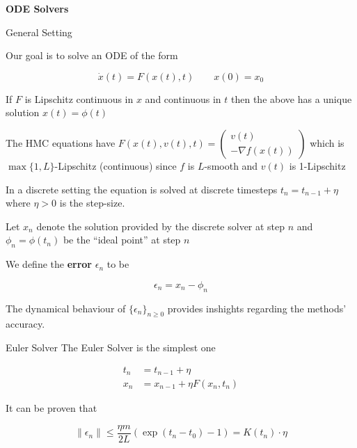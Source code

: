 \documentclass{beamer}
\begin{document}
\begin{frame}{}
    \vfill
    \centering
    \Large
    \textbf{ODE Solvers} 
    \vfill
\end{frame}

\begin{frame}[allowframebreaks]{General Setting}

Our goal is to solve an ODE of the form 

$$\dot x(t) = F(x(t), t) \qquad x(0) = x_0$$

\begin{theorem}
If $F$ is Lipschitz continuous in $x$ and continuous in $t$ then the above has a unique solution $x(t) = \phi(t)$
\end{theorem}

The HMC equations have $F(x(t), v(t), t) = \begin{pmatrix} v(t) \\ - \nabla f(x(t)) \end{pmatrix}$ which is $\max\{ 1, L \}$-Lipschitz (continuous) since $f$ is $L$-smooth and $v(t)$ is 1-Lipschitz

\framebreak

In a discrete setting the equation is solved at discrete timesteps $t_n = t_{n - 1} + \eta$ where $\eta > 0$ is the step-size. 

\medskip

Let $x_n$ denote the solution provided by the discrete solver at step $n$ and $\phi_n = \phi(t_n)$ be the ``ideal point'' at step $n$
     
\medskip 

We define the \textbf{error} $\epsilon_n$ to be 

$$\epsilon_n = x_n - \phi_n$$

The dynamical behaviour of $ \{ \epsilon_n \}_{n \ge 0}$ provides inshights regarding the methods' accuracy.  

\end{frame}

\begin{frame}{Euler Solver}
    The Euler Solver is the simplest one
    
    \begin{align*}
        t_n & = t_{n - 1} + \eta \\
        x_n & = x_{n - 1} + \eta F(x_n, t_n)
    \end{align*}
    
    It can be proven that 
    
    $$\| \epsilon_n \| \le \frac {\eta m} {2L} \left ( \exp(t_n - t_0) - 1 \right ) = K(t_n) \cdot \eta$$
    
\end{frame}
\end{document}
